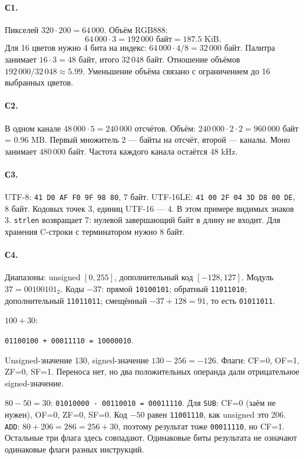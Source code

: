 \paragraph{С1.}
Пикселей $320\cdot200=64\,000$. Объём RGB888:
\[64\,000\cdot3=192\,000\text{ байт}=187.5\text{ KiB}.\]
Для 16 цветов нужно 4 бита на индекс:
$64\,000\cdot4/8=32\,000$ байт. Палитра занимает $16\cdot3=48$ байт,
итого $32\,048$ байт. Отношение объёмов $192\,000/32\,048\approx5.99$.
Уменьшение объёма связано с ограничением до 16 выбранных цветов.

\paragraph{С2.}
В одном канале $48\,000\cdot5=240\,000$ отсчётов.
Объём: $240\,000\cdot2\cdot2=960\,000$ байт = 0.96 MB.
Первый множитель 2 --- байты на отсчёт, второй --- каналы.
Моно занимает $480\,000$ байт. Частота каждого канала остаётся 48 kHz.

\paragraph{С3.}
UTF-8: \texttt{41 D0 AF F0 9F 98 80}, 7 байт.
UTF-16LE: \texttt{41 00 2F 04 3D D8 00 DE}, 8 байт.
Кодовых точек 3, единиц UTF-16 --- 4. В этом примере видимых знаков 3.
\texttt{strlen} возвращает 7: нулевой завершающий байт в длину не входит.
Для хранения C-строки с терминатором нужно 8 байт.

\paragraph{С4.}
Диапазоны: unsigned $[0,255]$, дополнительный код $[-128,127]$.
Модуль $37=00100101_2$. Коды $-37$:
прямой \texttt{10100101}; обратный \texttt{11011010};
дополнительный \texttt{11011011}; смещённый
$-37+128=91$, то есть \texttt{01011011}.

$100+30$:
\begin{center}\texttt{01100100 + 00011110 = 10000010}.\end{center}
Unsigned-значение 130, signed-значение $130-256=-126$.
Флаги: CF=0, OF=1, ZF=0, SF=1. Переноса нет, но два положительных
операнда дали отрицательное signed-значение.

$80-50=30$: \texttt{01010000 - 00110010 = 00011110}.
Для \texttt{SUB}: CF=0 (заём не нужен), OF=0, ZF=0, SF=0.
Код $-50$ равен \texttt{11001110}, как unsigned это 206.
\texttt{ADD}: $80+206=286=256+30$, поэтому результат тоже
\texttt{00011110}, но CF=1. Остальные три флага здесь совпадают.
Одинаковые биты результата не означают одинаковые флаги разных инструкций.

